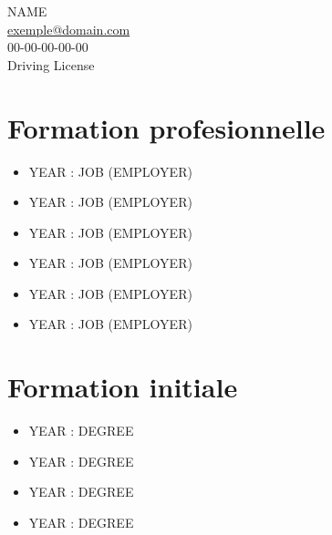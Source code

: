 \documentclass[a4paper,12pt,oneside]{extarticle}
\begin{document}
\pagestyle{empty}

\begin{flushleft}
NAME\\[0pt] %
 \href{mailto:exemple@domain.com}{exemple@domain.com}\\
00-00-00-00-00\\
Driving License
\end{flushleft}


\section*{Formation profesionnelle}
\noindent
\begin{flushleft}  \begin{itemize}
\item YEAR : JOB (EMPLOYER)\\
\item YEAR : JOB (EMPLOYER)\\
\item YEAR : JOB (EMPLOYER)
\item YEAR : JOB (EMPLOYER)
\item YEAR : JOB (EMPLOYER)
\item YEAR : JOB (EMPLOYER)
 \end{itemize}
\end{flushleft}


\section*{Formation initiale}
\noindent
\begin{flushleft}  \begin{itemize}
\item YEAR :  DEGREE
\item YEAR :  DEGREE
\item YEAR :  DEGREE
\item YEAR :  DEGREE
 \end{itemize}
\end{flushleft}

\end{document}
